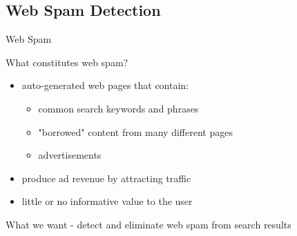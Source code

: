 \subsection{Web Spam Detection}

\begin{frame}{Web Spam}

What constitutes web spam?

\begin{itemize}

\item auto-generated web pages that contain:

\begin{itemize}
	\item common search keywords and phrases
	\item "borrowed" content from many different pages
	\item advertisements
\end{itemize}

\item produce ad revenue by attracting traffic

\item little or no informative value to the user

\end{itemize}

What we want - detect and eliminate web spam from search results
\end{frame}

